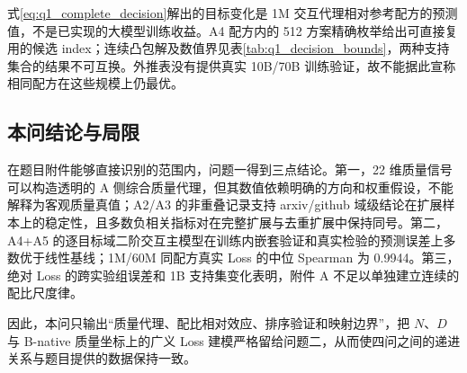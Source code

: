 式\eqref{eq:q1_complete_decision}解出的目标变化是 1M 交互代理相对参考配方的预测值，不是已实现的大模型训练收益。A4 配方内的 512 方案精确枚举给出可直接复用的候选 index；连续凸包解及数值界见表\ref{tab:q1_decision_bounds}，两种支持集合的结果不可互换。外推表没有提供真实 10B/70B 训练验证，故不能据此宣称相同配方在这些规模上仍最优。

\subsection{本问结论与局限}

在题目附件能够直接识别的范围内，问题一得到三点结论。第一，22 维质量信号可以构造透明的 A 侧综合质量代理，但其数值依赖明确的方向和权重假设，不能解释为客观质量真值；A2/A3 的非重叠记录支持 arxiv/github 域级结论在扩展样本上的稳定性，且多数负相关指标对在完整扩展与去重扩展中保持同号。第二，A4+A5 的逐目标域二阶交互主模型在训练内嵌套验证和真实检验的预测误差上多数优于线性基线；1M/60M 同配方真实 Loss 的中位 Spearman 为 0.9944。第三，绝对 Loss 的跨实验组误差和 1B 支持集变化表明，附件 A 不足以单独建立连续的配比尺度律。

因此，本问只输出“质量代理、配比相对效应、排序验证和映射边界”，把 $N$、$D$ 与 B-native 质量坐标上的广义 Loss 建模严格留给问题二，从而使四问之间的递进关系与题目提供的数据保持一致。
